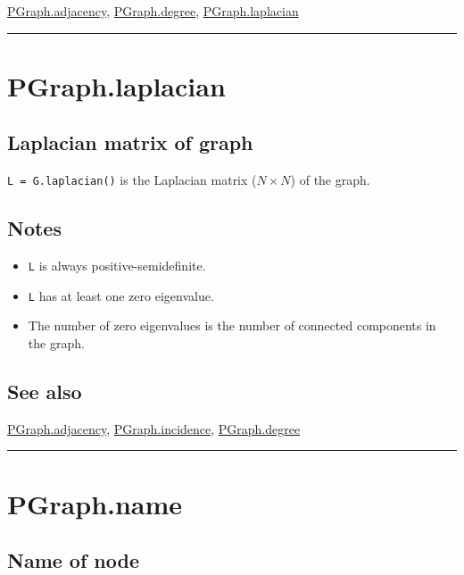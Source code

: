 \hyperlink{PGraph.adjacency}{\color{blue} PGraph.adjacency}, \hyperlink{PGraph.degree}{\color{blue} PGraph.degree}, \hyperlink{PGraph.laplacian}{\color{blue} PGraph.laplacian}

\vspace{1.5ex}\hrule

\hypertarget{PGraph.laplacian}{\section*{PGraph.laplacian}}
\subsection*{Laplacian matrix of graph}


\texttt{L = G.laplacian()} is the Laplacian matrix ($N \times N$) of the graph.


\subsection*{Notes}
\begin{itemize}
  \item \texttt{L} is always positive-semidefinite.
  \item \texttt{L} has at least one zero eigenvalue.
  \item The number of zero eigenvalues is the number of connected components    in the graph.
\end{itemize}

\subsection*{See also}


\hyperlink{PGraph.adjacency}{\color{blue} PGraph.adjacency}, \hyperlink{PGraph.incidence}{\color{blue} PGraph.incidence}, \hyperlink{PGraph.degree}{\color{blue} PGraph.degree}

\vspace{1.5ex}\hrule

\hypertarget{PGraph.name}{\section*{PGraph.name}}
\subsection*{Name of node}


